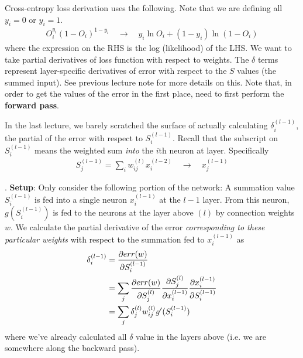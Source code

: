 \documentclass[12pt]{article}
\newcommand{\myspace}{\vspace{2\bigskipamount}}
\newcommand\p{\Needspace{10\baselineskip} \noindent}
\begin{document}
\p {} Cross-entropy loss derivation uses the following. Note that we are defining all $y_i = 0$ or $y_i = 1$. 
\begin{align}
	O_i^{y_i} (1 - O_i)^{1-y_i} \quad \rightarrow \quad y_i  \ln O_i + (1 - y_i) \ln (1 - O_i)
\end{align}
where the expression on the RHS is the log (likelihood) of the LHS. We want to take partial derivatives of loss function with respect to weights. The $\delta$ terms represent layer-specific derivatives of error with respect to the $S$ values (the summed input). See previous lecture note for more details on this. Note that, in order to get the values of the error in the first place, need to first perform the \textbf{forward pass}. 

\myspace
\p {} In the last lecture, we barely scratched the surface of actually calculating $\delta_i^{(l - 1)}$, the partial of the error with respect to $S_i^{(l - 1)}$. Recall that the subscript on $S_i^{(l - 1)}$ means the weighted sum \textit{into} the $i$th neuron at layer. Specifically 
\begin{align}
	S_j^{(l - 1)} =  \sum_i w_{ij}^{(l)} x_i^{(l - 2)} \quad \rightarrow \quad x_j^{(l - 1)}
\end{align}

\myspace
\p {}. \textbf{Setup}: Only consider the following portion of the network: A summation value $S_i^{(l - 1)}$ is fed into a single neuron $x_i^{(l - 1)}$ at the $l - 1$ layer. From this neuron, $g(S_i^{(l - 1)})$ is fed to the neurons at the layer above $(l)$ by connection weights $w$. We calculate the partial derivative of the error \textit{corresponding to these particular weights} with respect to the summation fed to $x_i^{(l - 1)}$ as
\begin{align}
	\delta_i^{(l - 1)} &= \frac{\partial err(w)}{\partial S_i^{(l - 1)}} \\
	&= \sum_j \frac{\partial err(w)}{\partial S_j^{(l)}}  \frac{\partial S_j^{(l)}}{\partial x_i^{(l - 1)}}  \frac{\partial x_i^{(l - 1)}}{\partial S_i^{(l - 1)}} \\
	&= \sum_j \delta_j^{(l)} w_{ij}^{(l)} g'(S_i^{(l - 1)}) 
\end{align}
where we've already calculated all $\delta$ value in the layers above (i.e. we are somewhere along the backward pass). 
\end{document}
